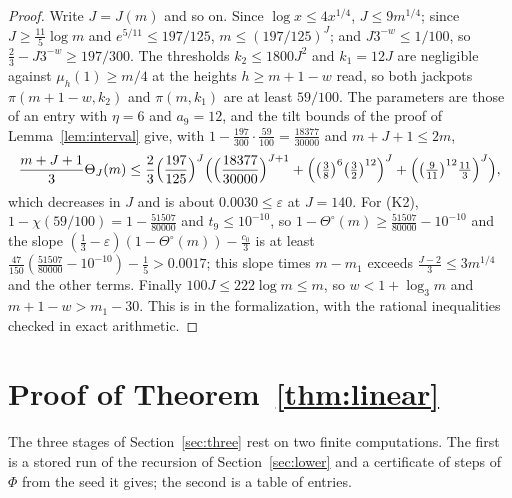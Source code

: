 \documentclass[11pt]{amsart}
\theoremstyle{definition}
\numberwithin{equation}{section}
\newcommand{\eps}{\varepsilon}
\begin{document}
\begin{proof}
Write $J=J(m)$ and so on. Since $\log x\le4x^{1/4}$, $J\le9m^{1/4}$; since $J\ge\frac{11}5\log m$ and $e^{5/11}\le197/125$, $m\le(197/125)^J$; and $J3^{-w}\le1/100$, so $\frac23-J3^{-w}\ge197/300$. The thresholds $k_2\le1800J^2$ and $k_1=12J$ are negligible against $\mu_h(1)\ge m/4$ at the heights $h\ge m+1-w$ read, so both jackpots $\pi(m+1-w,k_2)$ and $\pi(m,k_1)$ are at least $59/100$. The parameters are those of an entry with $\eta=6$ and $a_9=12$, and the tilt bounds of the proof of Lemma~\ref{lem:interval} give, with $1-\frac{197}{300}\cdot\frac{59}{100}=\frac{18377}{30000}$ and $m+J+1\le2m$,
\[
\frac{m+J+1}3\Theta_J(m)\le\frac23\Bigl(\frac{197}{125}\Bigr)^J\Bigl(\Bigl(\frac{18377}{30000}\Bigr)^{J+1}+\Bigl(\bigl(\tfrac38\bigr)^6\bigl(\tfrac32\bigr)^{12}\Bigr)^J+\Bigl(\bigl(\tfrac9{11}\bigr)^{12}\tfrac{11}3\Bigr)^J\Bigr),
\]
which decreases in $J$ and is about $0.0030\le\eps$ at $J=140$. For (K2), $1-\chi(59/100)=1-\frac{51507}{80000}$ and $t_9\le10^{-10}$, so $1-\Theta^\circ(m)\ge\frac{51507}{80000}-10^{-10}$ and the slope $(\frac13-\eps)(1-\Theta^\circ(m))-\frac{c_0}3$ is at least $\frac{47}{150}(\frac{51507}{80000}-10^{-10})-\frac15>0.0017$; this slope times $m-m_1$ exceeds $\frac{J-2}3\le3m^{1/4}$ and the other terms. Finally $100J\le222\log m\le m$, so $w<1+\log_3m$ and $m+1-w>m_1-30$. This is  in the formalization, with the rational inequalities checked in exact arithmetic.
\end{proof}

\section{Proof of Theorem~\ref{thm:linear}}\label{sec:proofthree}

The three stages of Section~\ref{sec:three} rest on two finite computations. The first is a stored run of the recursion of Section~\ref{sec:lower} and a certificate of steps of $\Phi$ from the seed it gives; the second is a table of entries.
\end{document}
